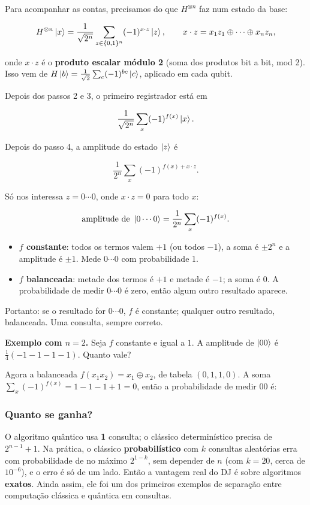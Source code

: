 Para acompanhar as contas, precisamos do que \(H^{\otimes n}\) faz num estado da base:

\[
H^{\otimes n}\left|{x}\right>=\frac{1}{\sqrt{2^n}}\sum_{z\in\{0,1\}^n}(-1)^{x\cdot z}\left|{z}\right>,\qquad x\cdot z=x_1z_1\oplus\cdots\oplus x_nz_n,
\]

onde \(x\cdot z\) é o \textbf{produto escalar módulo 2} (soma dos produtos bit a bit, mod 2). Isso vem de \(H\left|{b}\right>=\tfrac1{\sqrt2}\sum_{c}(-1)^{bc}\left|{c}\right>\), aplicado em cada qubit.

Depois dos passos 2 e 3, o primeiro registrador está em

\[
\frac{1}{\sqrt{2^n}}\sum_x(-1)^{f(x)}\left|{x}\right>.
\]

Depois do passo 4, a amplitude do estado \(\left|{z}\right>\) é

\[
\frac{1}{2^n}\sum_x(-1)^{f(x)+x\cdot z}.
\]

Só nos interessa \(z=0\cdots0\), onde \(x\cdot z=0\) para todo \(x\):

\[
\text{amplitude de }\left|{0\cdots0}\right>=\frac{1}{2^n}\sum_x(-1)^{f(x)}.
\]

\begin{itemize}
\tightlist
\item
  \textbf{\(f\) constante}: todos os termos valem \(+1\) (ou todos \(-1\)), a soma é \(\pm2^n\) e a amplitude é \(\pm1\). Mede \(0\cdots0\) com probabilidade 1.
\item
  \textbf{\(f\) balanceada}: metade dos termos é \(+1\) e metade é \(-1\); a soma é \(0\). A probabilidade de medir \(0\cdots0\) é zero, então algum outro resultado aparece.
\end{itemize}

Portanto: se o resultado for \(0\cdots0\), \(f\) é constante; qualquer outro resultado, balanceada. Uma consulta, sempre correto.

\textbf{Exemplo com \(n=2\).} Seja \(f\) constante e igual a \(1\). A amplitude de \(\left|{00}\right>\) é \(\tfrac14(-1-1-1-1)\). Quanto vale?

Agora a balanceada \(f(x_1x_2)=x_1\oplus x_2\), de tabela \((0,1,1,0)\). A soma \(\sum_x(-1)^{f(x)}=1-1-1+1=0\), então a probabilidade de medir \(00\) é:

\subsubsection{Quanto se ganha?}\label{quanto-se-ganha}

O algoritmo quântico usa \textbf{1} consulta; o clássico determinístico precisa de \(2^{n-1}+1\). Na prática, o clássico \textbf{probabilístico} com \(k\) consultas aleatórias erra com probabilidade de no máximo \(2^{1-k}\), sem depender de \(n\) (com \(k=20\), cerca de \(10^{-6}\)), e o erro é só de um lado. Então a vantagem real do DJ é sobre algoritmos \textbf{exatos}. Ainda assim, ele foi um dos primeiros exemplos de separação entre computação clássica e quântica em consultas.

